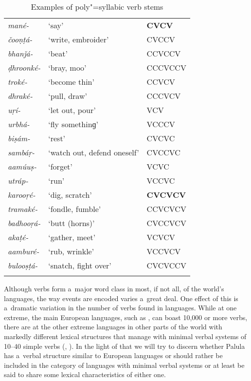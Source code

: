 \begin{table}[t]
\caption{Examples of poly"=syllabic verb stems}
\begin{tabularx}{\textwidth}{ Q l Q }
\lsptoprule
\textit{mané-} &
`say' &
\textbf{CVCV} \\
\textit{čooṇṭá-} &
`write, embroider' &
CVCCV\\
\textit{bhanǰá-} &
`beat' &
CCVCCV\\
\textit{ḍhroonké-} &
`bray, moo' &
CCCVCCV\\
\textit{troké-} &
`become thin' &
CCVCV\\
\textit{dhraké-} &
`pull, draw' &
CCCVCV\\
\textit{uṛí-} &
`let out, pour' &
VCV\\
\textit{urbhá-} &
`fly somethinɡ' &
VCCCV\\
\textit{biṣám-} &
`rest' &
CVCVC\\
\textit{sambáṛ-} &
`watch out, defend oneself' &
CVCCVC\\
\textit{aamúuṣ-} &
`forget' &
VCVC\\
\textit{utráp-} &
`run' &
VCCVC\\
\textit{karooṛé-} &
`dig, scratch' &
\textbf{CVCVCV}\\
\textit{tramaké-} &
`fondle, fumble' &
CCVCVCV\\
\textit{badhooṛá-} &
`butt (horns)' &
CVCCVCV\\
\textit{akaṭé-} &
`gather, meet' &
VCVCV\\
\textit{aamburé-} &
`rub, wrinkle' &
VCCVCV\\
\textit{bulooṣṭá-} &
`snatch, fight over' &
CVCVCCV
\\\lspbottomrule
\end{tabularx}
\label{tab:8-poly}
\end{table}


Although verbs form a~major word class in most, if not all, of the world's languages, the way events are encoded varies a~great deal. One effect of this is a~dramatic variation in the number of verbs found in languages. While at one extreme, the main European languages, such as \iliEnglish, can boast 10,000 or more verbs, there are at the other extreme languages in other parts of the world with markedly different lexical structures that manage with minimal verbal systems of 10--40 simple verbs (\citealt[347--348]{viberg1993}, \citeyear[409]{viberg2006}). In the light of that we will try to discern whether Palula has a~verbal structure similar to European languages or should rather be included in the category of languages with minimal verbal systems or at least be said to share some lexical characteristics of either one.



